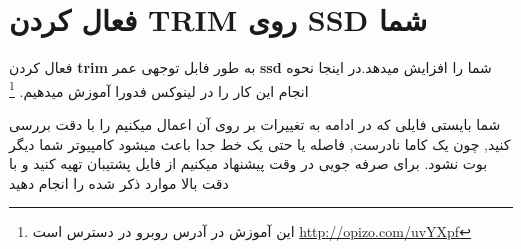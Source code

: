 \section{فعال کردن TRIM روی SSD شما}\label{se-44}
فعال کردن 
\textbf{trim}
به طور فابل توجهی عمر
\textbf{ssd}
شما را افزایش میدهد.در اینجا نحوه انجام این کار را در لینوکس فدورا آموزش میدهیم.
\footnote{این آموزش در آدرس روبرو در دسترس است
	\href{http://www.linuxfedora.ir/trim-ssd-t185.html}{http://opizo.com/uvYXpf}
}
\begin{tcolorbox}[title=خطر بوت نشدن]
شما بایستی فایلی که در ادامه به تغییرات بر روی آن اعمال میکنیم را با دقت بررسی کنید, چون یک کاما نادرست, فاصله یا حتی یک خط جدا باعث میشود کامپیوتر شما دیگر بوت نشود. برای صرفه جویی در وقت پیشنهاد میکنیم از فایل پشتیبان تهیه کنید و با دقت بالا موارد ذکر شده را انجام دهید
\end{tcolorbox}
